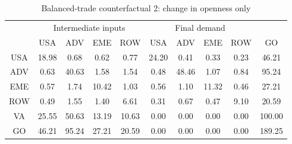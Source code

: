 \begin{table}[p]
\begin{center}
\caption{Balanced-trade counterfactual 2: change in openness only}
\label{tab:iomat-bal-trd-counter}
\small
\begin{tabular}{cccccccccc}
\toprule
& \multicolumn{4}{c}{Intermediate inputs}& \multicolumn{4}{c}{Final demand} & \\
\cmidrule(rl){2-5}\cmidrule(rl){6-9}
 &USA &ADV &EME &ROW &USA &ADV &EME &ROW& GO\\
\midrule
USA& 18.98& 0.68& 0.62& 0.77& 24.20& 0.41& 0.33& 0.23& 46.21 \\
ADV& 0.63& 40.63& 1.58& 1.54& 0.48& 48.46& 1.07& 0.84& 95.24 \\
EME& 0.57& 1.74& 10.42& 1.03& 0.56& 1.10& 11.32& 0.46& 27.21 \\
ROW& 0.49& 1.55& 1.40& 6.61& 0.31& 0.67& 0.47& 9.10& 20.59 \\
\midrule
VA& 25.55& 50.63& 13.19& 10.63& 0.00& 0.00& 0.00& 0.00& 100.00\\
\midrule
GO& 46.21& 95.24& 27.21& 20.59& 0.00& 0.00& 0.00& 0.00& 189.25\\
\bottomrule
\end{tabular}
\normalsize
\end{center}
\end{table}

